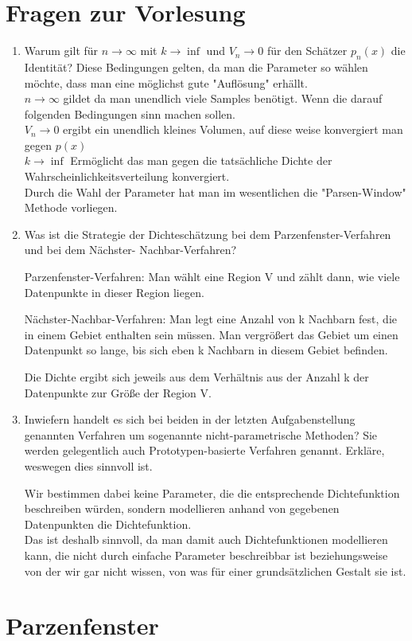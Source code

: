 \documentclass[a4paper]{scrartcl}
\begin{document}
\section{Fragen zur Vorlesung}
\begin{enumerate}
	\item Warum gilt für $n\rightarrow\infty$ mit $k\rightarrow\inf$ und $V_n \rightarrow 0$ für den Schätzer $p_n(x)$ die Identität?
	Diese Bedingungen gelten, da man die Parameter so wählen möchte, dass man eine möglichst gute "Auflösung" erhällt. \\
	$n\rightarrow\infty$ gildet da man unendlich viele Samples benötigt. Wenn die darauf folgenden Bedingungen sinn machen sollen. \\
	$V_n \rightarrow 0$ ergibt ein unendlich kleines Volumen, auf diese weise konvergiert man gegen $p(x)$\\
	$k\rightarrow\inf$ Ermöglicht das man gegen die tatsächliche Dichte der Wahrscheinlichkeitsverteilung konvergiert. \\
	Durch die Wahl der Parameter hat man im wesentlichen die "Parsen-Window" Methode vorliegen.  
		
	\item Was ist die Strategie der Dichteschätzung bei dem Parzenfenster-Verfahren und bei dem Nächster-
	Nachbar-Verfahren?
	
	Parzenfenster-Verfahren: Man wählt eine Region V und zählt dann, wie viele Datenpunkte in dieser Region liegen.
	
	Nächster-Nachbar-Verfahren: Man legt eine Anzahl von k Nachbarn fest, die in einem Gebiet enthalten sein müssen. Man vergrößert das Gebiet um einen Datenpunkt so lange, bis sich eben k Nachbarn in diesem Gebiet befinden.
	
	Die Dichte ergibt sich jeweils aus dem Verhältnis aus der Anzahl k der Datenpunkte zur Größe der Region V.
	
	\item Inwiefern handelt es sich bei beiden in der letzten Aufgabenstellung genannten Verfahren um
	sogenannte nicht-parametrische Methoden? Sie werden gelegentlich auch Prototypen-basierte
	Verfahren genannt. Erkläre, weswegen dies sinnvoll ist.
	
	Wir bestimmen dabei keine Parameter, die die entsprechende Dichtefunktion beschreiben würden, sondern modellieren anhand von gegebenen Datenpunkten die Dichtefunktion.\\
	Das ist deshalb sinnvoll, da man damit auch Dichtefunktionen modellieren kann, die nicht durch einfache Parameter beschreibbar ist beziehungsweise von der wir gar nicht wissen, von was für einer grundsätzlichen Gestalt sie ist.
\end{enumerate}

\section{Parzenfenster}
\end{document}
